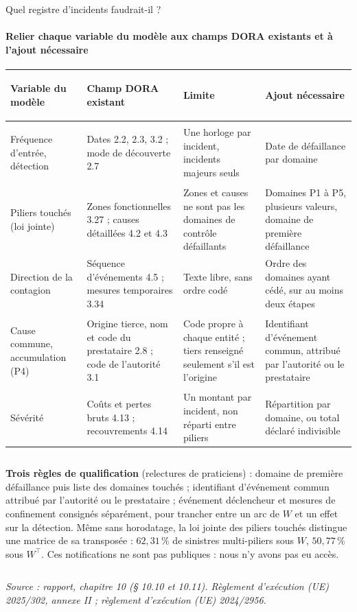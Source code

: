 \documentclass[aspectratio=169,10pt,t]{beamer}
\newcommand{\source}[1]{\par\vfill{\tiny\color{gris}\textit{Source : #1}}\par\vspace{-1mm}}
\renewcommand{\arraystretch}{1.25}
\begin{document}
\begin{frame}{Quel registre d'incidents faudrait-il ?}
  \suivimethode{}{}
  \framesubtitle{\ajout Relier chaque variable du modèle aux champs DORA existants et à l'ajout nécessaire}
  \scriptsize
  \renewcommand{\arraystretch}{1.0}
  \begin{tabularx}{\linewidth}{@{}>{\bfseries\raggedright\arraybackslash}p{.14\linewidth} Y Y Y@{}}
    \toprule
    Variable du modèle & Champ DORA existant & Limite & Ajout nécessaire \\
    \midrule
    Fréquence d'entrée, détection & Dates 2.2, 2.3, 3.2 ; mode de découverte 2.7 & Une horloge par incident, incidents majeurs seuls & Date de défaillance par domaine \\
    Piliers touchés (loi jointe) & Zones fonctionnelles 3.27 ; causes détaillées 4.2 et 4.3 & Zones et causes ne sont pas les domaines de contrôle défaillants & Domaines P1 à P5, plusieurs valeurs, domaine de première défaillance \\
    Direction de la contagion & Séquence d'événements 4.5 ; mesures temporaires 3.34 & Texte libre, sans ordre codé & Ordre des domaines ayant cédé, sur au moins deux étapes \\
    Cause commune, accumulation (P4) & Origine tierce, nom et code du prestataire 2.8 ; code de l'autorité 3.1 & Code propre à chaque entité ; tiers renseigné seulement s'il est l'origine & Identifiant d'événement commun, attribué par l'autorité ou le prestataire \\
    Sévérité & Coûts et pertes bruts 4.13 ; recouvrements 4.14 & Un montant par incident, non réparti entre piliers & Répartition par domaine, ou total déclaré indivisible \\
    \bottomrule
  \end{tabularx}
  \vspace{1.5mm}
  \begin{columns}[T,onlytextwidth]
    \footnotesize
    \textbf{Trois règles de qualification} (relectures de praticiens) : domaine de première défaillance puis liste des domaines touchés ; identifiant d'événement commun attribué par l'autorité ou le prestataire ; événement déclencheur et mesures de confinement consignés séparément, pour trancher entre un arc de $W$ et un effet sur la détection.
    \footnotesize
    Même sans horodatage, la loi jointe des piliers touchés distingue une matrice de sa transposée : $62{,}31\,\%$ de sinistres multi-piliers sous $W$, $50{,}77\,\%$ sous $W^\top$. Ces notifications ne sont pas publiques : nous n'y avons pas eu accès.
  \end{columns}
  \source{rapport, chapitre 10 (§ 10.10 et 10.11). Règlement d'exécution (UE) 2025/302, annexe II ; règlement d'exécution (UE) 2024/2956.}
\end{frame}
\end{document}
